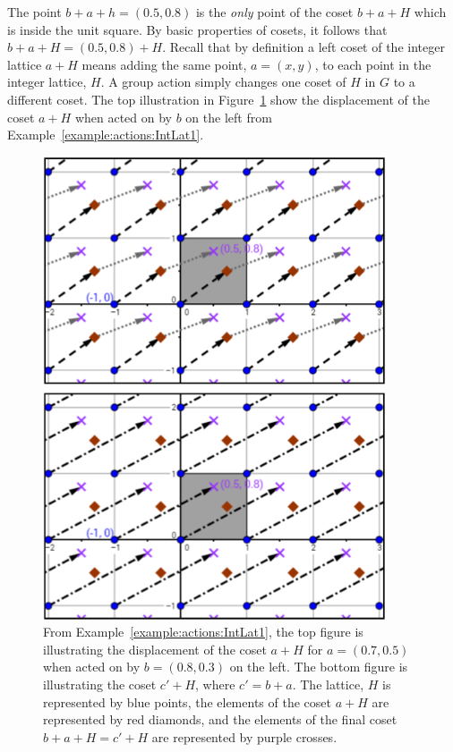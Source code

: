 The point $b+a+h=(0.5,0.8)$ is the \emph{only} point of the coset $b+a+H$ which is inside the unit square. By basic properties of cosets, it follows that $b+a+H =(0.5, 0.8)+H$. Recall that by definition a left coset of the integer lattice $a+H$ means adding the same point, $a=(x,y)$, to each point in the integer lattice, $H$. A group action simply changes one coset of $H$ in $G$ to a different coset.  The top illustration in Figure~\ref{fig:IntegerLattice1} show the displacement of the coset $a+H$ when acted on by $b$ on the left from Example~\ref{example:actions:IntLat1}. 

\begin{figure}[htpb]
\begin{center}
\includegraphics[width=4.0in]{images/Lattice_baHcH.png}
\caption{From Example~\ref{example:actions:IntLat1}, the top figure is illustrating the displacement of the coset $a+H$ for $a=(0.7,0.5)$ when acted on by $b=(0.8,0.3)$ on the left. The bottom figure is illustrating the coset $c'+H$, where $c'=b+a$. The lattice, $H$ is represented by blue points, the elements of the coset $a+H$ are represented by red diamonds, and the elements of the final coset $b+a+H=c'+H$ are represented by purple crosses.}
\label{fig:IntegerLattice1}
\end{center}
\end{figure}

